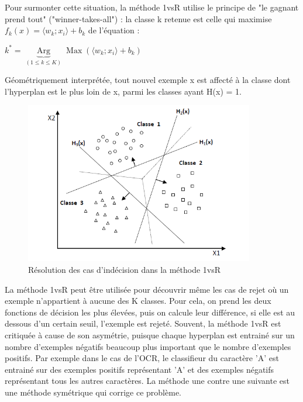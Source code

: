 \documentclass[12pt,a4paper]{report}
\begin{document}
Pour surmonter cette situation, la méthode 1vsR utilise le principe de "le gagnant prend
tout" ("winner-takes-all") : la classe k retenue est celle qui maximise $ f_{k}(x) = \langle w_{k}; x_{i}\rangle + b_{k} $
de l’équation :
\begin{center}
	$k^*=\underbrace{\operatorname{Arg}}_{(1 \leq k \leq K)} \operatorname{Max}\left(\langle w_{k}; x_{i}\rangle + b_{k}\right)$
\end{center}
Géométriquement interprétée, tout nouvel exemple x est affecté à la classe dont l’hyperplan
est le plus loin de x, parmi les classes ayant H(x) = 1.
\newpage
\begin{figure}[!ht]
	\centering
	\includegraphics[width=10cm]{images/capt5}
	\caption{Résolution des cas d’indécision dans la méthode 1vsR}
\end{figure}
La méthode 1vsR peut être utilisée pour découvrir même les cas de rejet où un exemple n’appartient à aucune des K classes. Pour cela, on prend les deux fonctions de décision
les plus élevées, puis on calcule leur différence, si elle est au dessous d’un certain seuil,
l’exemple est rejeté.
Souvent, la méthode 1vsR est critiquée à cause de son asymétrie, puisque chaque hyperplan
est entrainé sur un nombre d’exemples négatifs beaucoup plus important que le
nombre d’exemples positifs. Par exemple dans le cas de l’OCR, le classifieur du caractère
’A’ est entrainé sur des exemples positifs représentant ’A’ et des exemples négatifs représentant
tous les autres caractères. La méthode une contre une suivante est une méthode
symétrique qui corrige ce problème.
\end{document}
